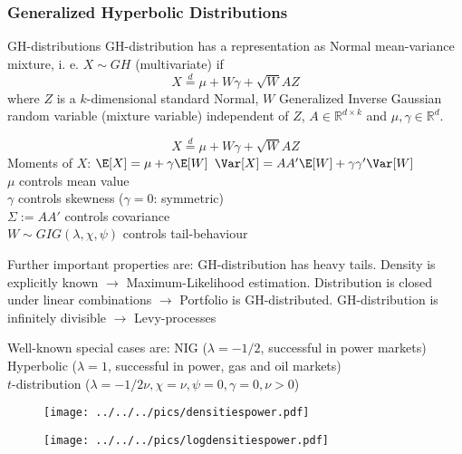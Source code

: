 \subsubsection{Generalized Hyperbolic Distributions}
GH-distributions
	GH-distribution has a representation as Normal mean-variance mixture, i. e. $X\sim GH$
	(multivariate) if
	$$X\stackrel{d}{=}\mu+W\gamma+\sqrt{W}AZ$$
	where $Z$ is a $k$-dimensional standard Normal, $W$ Generalized
	Inverse Gaussian random variable (mixture variable) independent of
	$Z$, $A\in\mathbb{R}^{d\times k}$ and $\mu, \gamma \in
	\mathbb{R}^d$.
	
	$$X\stackrel{d}{=}\mu+W\gamma+\sqrt{W}AZ$$
	 Moments of $X$:
			 $\E[X]=\mu+\gamma\E[W]$
			 $\Var[X]=AA'\E[W]+\gamma\gamma'\Var[W]$\\[-1.5cm]
	 $\mu$ controls mean value\\[-1.5cm]
	 $\gamma$ controls skewness ($\gamma=0$: symmetric)\\[-1.5cm]
	 $\Sigma:=AA'$ controls covariance\\[-1.5cm]
	 $W\sim GIG(\lambda,\chi,\psi)$ controls tail-behaviour


	Further important properties are: %
		GH-distribution has heavy tails.  Density is explicitly
		known $\rightarrow$ Maximum-Likelihood estimation. 
		Distribution is closed under linear combinations $\rightarrow$
		Portfolio is GH-distributed.  GH-distribution is infinitely
		divisible $\rightarrow$ Levy-processes


	Well-known special cases are:
	 NIG ($\lambda=-1/2$, successful in power markets)\\[-1.5cm]
	 Hyperbolic ($\lambda=1$, successful in power, gas and oil markets)\\[-1.5cm]
	 $t$-distribution ($\lambda=-1/2\nu, \chi=\nu, \psi=0, \gamma=0, \nu>0$)


\begin{center}
\begin{figure}
\texttt{[image: ../../../pics/densitiespower.pdf]}
\end{figure}
\end{center}

\begin{center}
\begin{figure}
\texttt{[image: ../../../pics/logdensitiespower.pdf]}
\end{figure}
\end{center}

